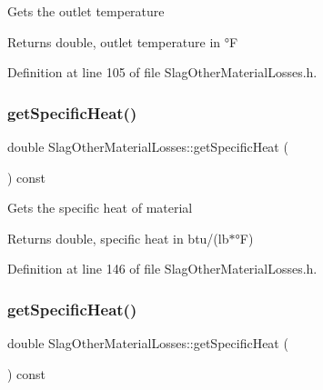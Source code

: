 Gets the outlet temperature

\begin{DoxyReturn}{Returns}
double, outlet temperature in °F 
\end{DoxyReturn}


Definition at line 105 of file Slag\+Other\+Material\+Losses.\+h.

\mbox{\label{class_slag_other_material_losses_aa68e92bdf836a4112c55344f897f2649}} 
\subsubsection{\texorpdfstring{get\+Specific\+Heat()}{getSpecificHeat()}\hspace{0.1cm}{\footnotesize\ttfamily [1/3]}}
{\footnotesize\ttfamily double Slag\+Other\+Material\+Losses\+::get\+Specific\+Heat (\begin{DoxyParamCaption}{ }\end{DoxyParamCaption}) const\hspace{0.3cm}{\ttfamily [inline]}}

Gets the specific heat of material

\begin{DoxyReturn}{Returns}
double, specific heat in btu/(lb$\ast$°F) 
\end{DoxyReturn}


Definition at line 146 of file Slag\+Other\+Material\+Losses.\+h.

\mbox{\label{class_slag_other_material_losses_aa68e92bdf836a4112c55344f897f2649}} 
\subsubsection{\texorpdfstring{get\+Specific\+Heat()}{getSpecificHeat()}\hspace{0.1cm}{\footnotesize\ttfamily [2/3]}}
{\footnotesize\ttfamily double Slag\+Other\+Material\+Losses\+::get\+Specific\+Heat (\begin{DoxyParamCaption}{ }\end{DoxyParamCaption}) const\hspace{0.3cm}{\ttfamily [inline]}}

